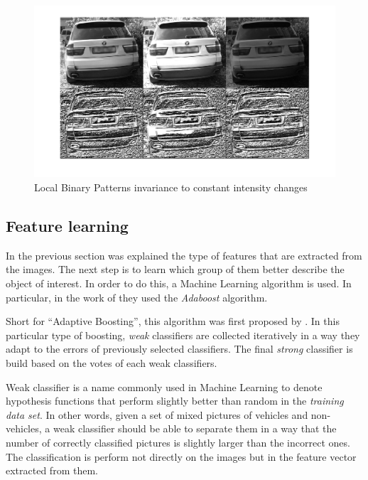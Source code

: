 \begin{figure}
\begin{center}
    \includegraphics[scale=0.3]{img/invariance.png}
\end{center}
\caption{Local Binary Patterns invariance to constant intensity changes}
\label{fig:lbp-invariant}
\end{figure}



\subsection{Feature learning} %
\label{sub:feature-learning}

In the previous section was explained the type of features that are extracted
from the images. The next step is to learn which group of them better describe
the object of interest. In order to do this, a Machine Learning
algorithm is used. In particular, in the work of \cite{viola-jones} they used the
\textit{Adaboost} algorithm. 

Short for ``Adaptive Boosting'', this algorithm was first proposed by
\cite{freund}. In this particular type of boosting, \textit{weak} classifiers
are collected iteratively in a way they adapt to the errors of previously
selected classifiers. The final \textit{strong} classifier is build based on the
votes of each weak classifiers. 

Weak classifier is a name commonly used in Machine Learning to denote hypothesis 
functions that perform slightly better than random in the \textit{training data
set}. In other words, given a set of mixed pictures of vehicles and non-vehicles, a
weak classifier should be able to separate them in a way that the number of
correctly classified pictures is slightly larger than the incorrect ones. The
classification is perform not directly on the images but in the feature vector
extracted from them.

